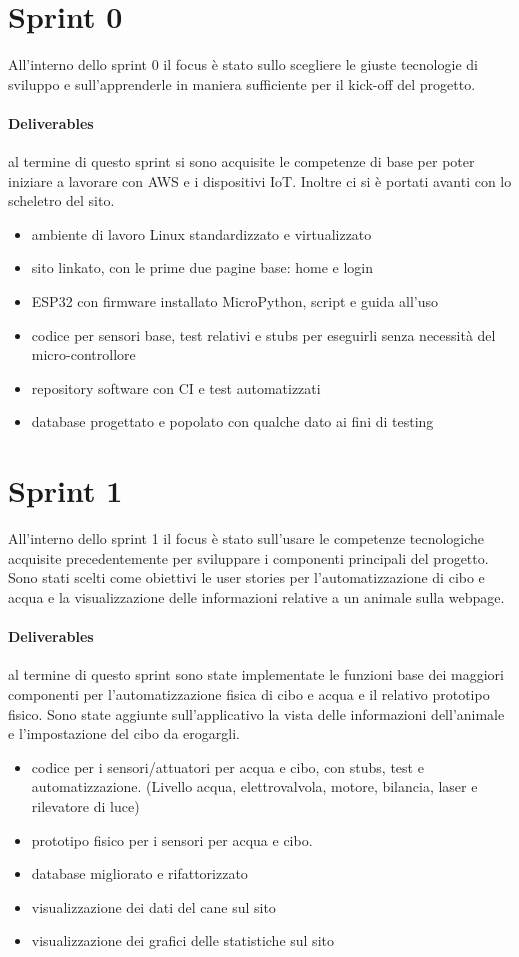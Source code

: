 \section{Sprint 0}
All'interno dello sprint 0 il focus è stato sullo scegliere le giuste tecnologie di sviluppo e sull'apprenderle in maniera sufficiente per il kick-off del progetto.
\paragraph{Deliverables} 
al termine di questo sprint si sono acquisite le competenze di base per poter iniziare a lavorare con AWS e i dispositivi IoT. Inoltre ci si è portati avanti con lo scheletro del sito.
\begin{itemize}
    \item ambiente di lavoro Linux standardizzato e virtualizzato
    \item sito linkato, con le prime due pagine base: home e login
    \item ESP32 con firmware installato MicroPython, script e guida all'uso
    \item codice per sensori base, test relativi e stubs per eseguirli senza necessità del micro-controllore
    \item repository software con CI e test automatizzati 
    \item database progettato e popolato con qualche dato ai fini di testing
\end{itemize}

\section{Sprint 1}
All'interno dello sprint 1 il focus è stato sull'usare le competenze tecnologiche acquisite precedentemente per sviluppare i componenti principali del progetto. Sono stati scelti come obiettivi le user stories per l'automatizzazione di cibo e acqua e la visualizzazione delle informazioni relative a un animale sulla webpage.
\paragraph{Deliverables}
al termine di questo sprint sono state implementate le funzioni base dei maggiori componenti per l'automatizzazione fisica di cibo e acqua e il relativo prototipo fisico. Sono state aggiunte sull'applicativo la vista delle informazioni dell'animale e l'impostazione del cibo da erogargli. 
\begin{itemize}
    \item codice per i sensori/attuatori per acqua e cibo, con stubs, test e automatizzazione. (Livello acqua, elettrovalvola, motore, bilancia, laser e rilevatore di luce)
    \item prototipo fisico per i sensori per acqua e cibo. 
    \item database migliorato e rifattorizzato
    \item visualizzazione dei dati del cane sul sito 
    \item visualizzazione dei grafici delle statistiche sul sito 
\end{itemize}

